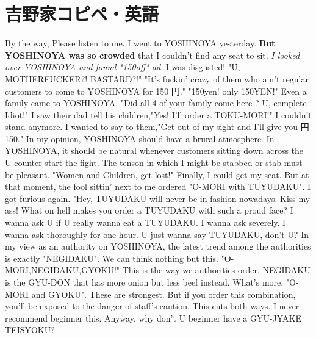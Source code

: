 \documentclass[14pt,a4paper]{ltjsarticle}
\begin{document}
\section{吉野家コピペ・英語}

By the way, Please listen to me. 
I went to YOSHINOYA yesterday. 
\textbf{But YOSHINOYA was so crowded}
that I couldn't find any seat to sit.
\emph{I looked over YOSHINOYA and found "150off" ad}. 
I was disgusted! "U, MOTHERFUCKER?! BASTARD?!" 
"It's fuckin' crazy of them who ain't regular customers 
to come to YOSHINOYA for 150 円." 
"150yen! only 150YEN!" 
Even a family came to YOSHINOYA. "Did all 4 of your family come here ? 
U, complete Idiot!" 
I saw their dad tell his children,"Yes! I'll order a TOKU-MORI!" 
I couldn't stand anymore. 
I wanted to say to them,"Get out of my sight and I'll give you 円 150." 
In my opinion, YOSHINOYA should have a brural atmosphere. 
In YOSHINOYA, it should be natural whenever customers 
sitting down across the U-counter start the fight. 
The tenson in which I might be stabbed or stab must be pleasant. 
"Women and Children, get lost!" 
Finally, I could get my seat. But at that moment, 
the fool sittin' next to me ordered "O-MORI with TUYUDAKU". 
I got furious again. 
"Hey, TUYUDAKU will never be in fashion nowadays. 
Kiss my ass! 
What on hell makes you order a TUYUDAKU with such a proud face? 
I wanna ask U if U really wanna eat a TUYUDAKU. 
I wanna ask severely. 
I wanna ask thoroughly for one hour. 
U just wanna say TUYUDAKU, don't U? 
In my view as an authority on YOSHINOYA, 
the latest trend among the authorities is exactly "NEGIDAKU". 
We can think nothing but this. 
"O-MORI,NEGIDAKU,GYOKU!" This is the way we authorities order. 
NEGIDAKU is the GYU-DON that has more onion but less beef instead. 
What's more, "O-MORI and GYOKU". These are strongest. 
But if you order this combination, you'll be exposed to the danger of 
staff's caution. This cuts both ways. 
I never recommend beginner this. 
Anyway, why don't U beginner have a GYU-JYAKE TEISYOKU? 
\end{document}
